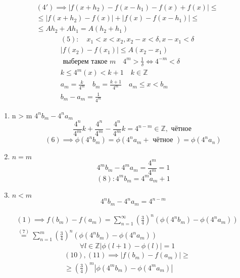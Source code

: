 \documentclass[main]{subfiles}
\begin{document}
\begin{example}
          \begin{multline*}
          (4\prime) \implies |f(x+h_2) - f(x-h_1) -f(x) + f(x)| \leq \\ 
          \leq  |f(x+h_2)-f(x)| + |f(x) - f(x-h_1)| \leq \\
          \leq Ah_2 + Ah_1 = A(h_2 + h_1) \tag{5} \end{multline*}
          \begin{gather*}
          (5): \quad x_1 < x < x_2, x_2 - x  < \delta, x - x_1 < \delta \\
          |f(x_2) - f(x_1)| \leq A(x_2-x_1) \tag{5\prime} \\
          \text{ выберем такое } m \quad 4^m > \frac{1}{\delta} \Leftrightarrow 4^{-m} < \delta \\
          k \leq 4^m(x) < k+1 \quad k \in \mathbb{Z} \\     
          a_m = \frac{k}{4^m} \quad b_m = \frac{k+1}{4^m} \quad a_m \leq x < b_m \\
          b_m - a_m = \frac{1}{4^m} 
     \end{gather*}
          \begin{enumerate}
          \item n > m          
          $4^nb_m-4^na_m$ \\
          \[\frac{4^n}{4^m}k + \frac{4^n}{4^m} - \frac{4^n}{4^m}k = 4^{n-m} \in \mathbb{Z}, \text{ чётное } \tag{6} \]
          \[(6) \implies \phi(4^nb_m) = \phi(4^na_m + \text { чётное }) =  \phi(4^na_n) \tag{7} \]
          \item $n = m$ \\
           \[4^mb_m - 4^ma_m = \frac{4^m}{4^m} = 1 \tag{8} \]
          \[(8): 4^mb_m = 4^m a_m + 1 \] 
          \item $ n < m $
          \[ 4^nb_m - 4^na_m = 4^{n-m} \tag{9} \]
          \end{enumerate}
          \begin{multline*}
          (1) \implies f(b_m) - f(a_m) = \sum^\infty_{n=1} \left( \frac{3}{4} \right) ^n (\phi(4^nb_m) - \phi(4^na_m)) \\
          \stackrel{(7)}{=} \sum^m_{n=1} \left( \frac{3}{4} \right)^n(\phi(4^nb_m) - \phi(4^na_m)) \tag{10} \end{multline*}
          \[\forall l \in \mathbb{Z} |\phi(l+1) - \phi(l)| = 1 \tag{11} \]
          \begin{multline*}
          (10), (11) \implies |f(b_m) - f(a_m)|  \geq \\ \geq \left( \frac{3}{4} \right)^m |\phi(4^mb_m) - \phi(4^ma_m)|

\end{multline*}
\end{example}
\end{document}
